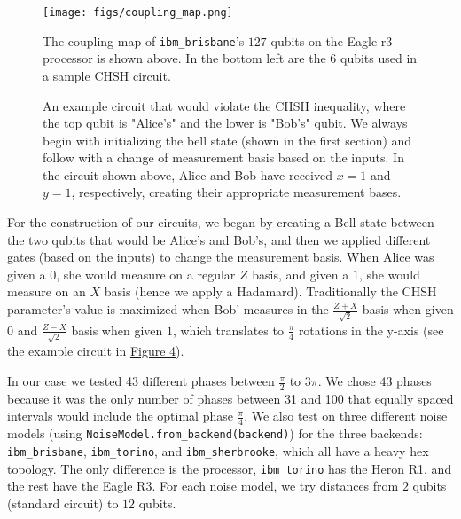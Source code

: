 \documentclass{article}
\begin{document}
\begin{figure}
    \centering
    \texttt{[image: figs/coupling\_map.png]}
    \caption{The coupling map of \texttt{ibm\_brisbane}'s  $127$ qubits on the Eagle r3 processor is shown above. In the bottom left are the $6$ qubits used in a sample CHSH circuit.}
    \label{fig:coupling-map}
\end{figure}


\begin{figure}
    \centering
    \scalebox{1.25}{
        \[
            \Qcircuit @C=1em @R=1em {
            \lstick{\left| 0 \right\rangle} & \gate{H}  & \ctrl{1} \barrier[0em]{1} & \qw & \gate{H}  \barrier[0em]{1} & \qw & \meter  \\
            \lstick{\left| 0 \right\rangle} & \qw & \targ & \qw & \gate{R_y(\phi)} & \qw  &  \qw & \meter \\
            & \cw & \cw & \cw & \cw & \cw & \cw \cwx[-2] & \cw \cwx[-1] & \cw \\
            }
        \] 
    }
    \caption{An example circuit that would violate the CHSH inequality, where the top qubit is "Alice's" and the lower is "Bob's" qubit. We always begin with initializing the bell state (shown in the first section) and follow with a change of measurement basis based on the inputs. In the circuit shown above, Alice and Bob have received $x = 1$ and $y = 1$, respectively, creating their appropriate measurement bases. }
    \label{fig:circuit-basic}
\end{figure}

For the construction of our circuits, we began by creating a Bell state between the two qubits that would be Alice's and Bob’s, and then we applied different gates (based on the inputs) to change the measurement basis. When Alice was given a $0$, she would measure on a regular $Z$ basis, and given a $1$, she would measure on an $X$ basis (hence we apply a Hadamard). Traditionally the CHSH parameter’s value is maximized when Bob’ measures in the $\frac{Z+X}{\sqrt2}$ basis when given $0$ and $\frac{Z-X}{\sqrt2}$ basis when given $1$, which translates to $\frac{\pi}{4}$ rotations in the y-axis (see the example circuit in \hyperref[fig:circuit-basic]{Figure 4}). 

In our case we tested 43 different phases between $\frac{\pi}{2}$ to $3\pi$. We chose 43 phases because it was the only number of phases between 31 and 100 that equally spaced intervals would include the optimal phase $\frac{\pi}{4}$. We also test on three different noise models (using \verb|NoiseModel.from_backend(backend)|) for the three backends: \verb|ibm_brisbane|, \verb|ibm_torino|, and \verb|ibm_sherbrooke|, which all have a heavy hex topology. The only difference is the processor, \verb|ibm_torino| has the Heron R1, and the rest have the Eagle R3. For each noise model, we try distances from $2$ qubits (standard circuit) to $12$ qubits.
\end{document}
